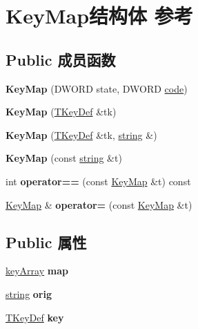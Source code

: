 \hypertarget{struct_key_map}{}\section{Key\+Map结构体 参考}
\label{struct_key_map}
\subsection*{Public 成员函数}
\begin{DoxyCompactItemize}
\item 
\mbox{\label{struct_key_map_a8af888d92da6ed680553d78a23d0e834}} 
{\bfseries Key\+Map} (D\+W\+O\+RD state, D\+W\+O\+RD \hyperlink{structcode}{code})
\item 
\mbox{\label{struct_key_map_aad5d79bd97771527f495376b06f2721e}} 
{\bfseries Key\+Map} (\hyperlink{class_t_key_def}{T\+Key\+Def} \&tk)
\item 
\mbox{\label{struct_key_map_aa4c82b94427b411065a8198e0dd88a7e}} 
{\bfseries Key\+Map} (\hyperlink{class_t_key_def}{T\+Key\+Def} \&tk, \hyperlink{structstring}{string} \&)
\item 
\mbox{\label{struct_key_map_ac0889ed804eef5beb9eb9e9bc12fb726}} 
{\bfseries Key\+Map} (const \hyperlink{structstring}{string} \&t)
\item 
\mbox{\label{struct_key_map_a79ae3602b0d60a3e0d09b78f937b7b05}} 
int {\bfseries operator==} (const \hyperlink{struct_key_map}{Key\+Map} \&t) const
\item 
\mbox{\label{struct_key_map_a3d0c7ec9b2d75ece6cc6f71d889892cf}} 
\hyperlink{struct_key_map}{Key\+Map} \& {\bfseries operator=} (const \hyperlink{struct_key_map}{Key\+Map} \&t)
\end{DoxyCompactItemize}
\subsection*{Public 属性}
\begin{DoxyCompactItemize}
\item 
\mbox{\label{struct_key_map_a35ffb662fec82527e20049a7b5a2df88}} 
\hyperlink{class_t_array_as_vector}{key\+Array} {\bfseries map}
\item 
\mbox{\label{struct_key_map_a93f2878020eaa35eab55bc14c1ba4a95}} 
\hyperlink{structstring}{string} {\bfseries orig}
\item 
\mbox{\label{struct_key_map_afba5be4ff82c6de32f72732035647ae3}} 
\hyperlink{class_t_key_def}{T\+Key\+Def} {\bfseries key}
\end{DoxyCompactItemize}
